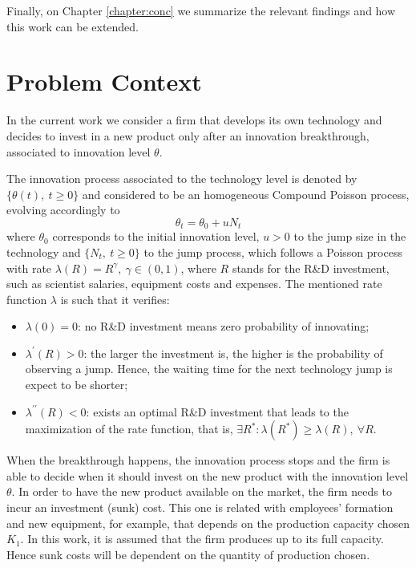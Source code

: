 Finally, on Chapter \ref{chapter:conc} we summarize the relevant findings and how this work can be extended.


\section{Problem Context}
\label{section:context}

In the current work we consider a firm that develops its own technology and decides to invest in a new product only after an innovation breakthrough, associated to innovation level $\theta$.


The innovation process associated to the technology level is denoted by $\{ \theta(t), \ t \geq 0 \}$ and considered to be an homogeneous Compound Poisson process, evolving accordingly to
$$\theta_t= \theta_0+ u N_t$$  
where $\theta_0$ corresponds to the initial innovation level, $u > 0$ to the jump size in the technology and $\{N_t, \ t \geq 0\}$  to the jump process, which follows a Poisson process with rate $\lambda(R)=R^\gamma, \ \gamma \in (0,1)$, where $R$ stands for the R\&D investment, such as scientist salaries, equipment costs and expenses. The mentioned rate function $\lambda$ is such that it verifies:
\begin{itemize}
	\item $\lambda(0) = 0$: no R\&D investment means zero probability of innovating;
	\item $\lambda^\prime (R)>0$: the larger the investment is, the higher is the probability of observing a jump. Hence, the waiting time for the next technology jump is expect to be shorter;
	\item $ \lambda ^{ \prime \prime} (R)<0$: exists an optimal R\&D investment that leads to the maximization of the rate function, that is, $\exists R^*: \lambda(R^*)\geq \lambda(R), \  \forall R$.
\end{itemize}


When the breakthrough happens, the innovation process stops and the firm is able to decide when it should invest on the new product with the innovation level $\theta$. In order to have the new product available on the market, the firm needs to incur an investment (sunk) cost. This one is related with employees' formation and new equipment, for example, that depends on the production capacity chosen $K_1$. In this work, it is assumed that the firm produces up to its full capacity. Hence sunk costs will be dependent on the quantity of production chosen.

